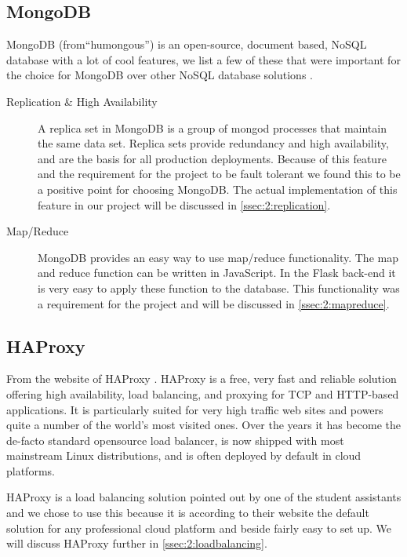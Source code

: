 \subsection{MongoDB}
\label{ssec:2:mongodb}
MongoDB (from``humongous'') is an open-source, document based, NoSQL database with a lot of cool features, we list a few of these that were important for the choice for MongoDB over other NoSQL database solutions \cite{mongo-db}.

\begin{description}
\item[Replication \& High Availability] A replica set in MongoDB is a group of mongod processes that maintain the same data set. Replica sets provide redundancy and high availability, and are the basis for all production deployments. Because of this feature and the requirement for the project to be fault tolerant we found this to be a positive point for choosing MongoDB. The actual implementation of this feature in our project will be discussed in \autoref{ssec:2:replication}.

\item[Map/Reduce] MongoDB provides an easy way to use map/reduce functionality. The map and reduce function can be written in JavaScript. In the Flask back-end it is very easy to apply these function to the database. This functionality was a requirement for the project and will be discussed in \autoref{ssec:2:mapreduce}.
\end{description}

\subsection{HAProxy}
\label{ssec:2:haproxy}
From the website of HAProxy \cite{ha-proxy}. HAProxy is a free, very fast and reliable solution offering high availability, load balancing, and proxying for TCP and HTTP-based applications. It is particularly suited for very high traffic web sites and powers quite a number of the world's most visited ones. Over the years it has become the de-facto standard opensource load balancer, is now shipped with most mainstream Linux distributions, and is often deployed by default in cloud platforms.

HAProxy is a load balancing solution pointed out by one of the student assistants and we chose to use this because it is according to their website the default solution for any professional cloud platform and beside fairly easy to set up. We will discuss HAProxy further in \autoref{ssec:2:loadbalancing}.

